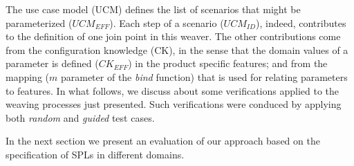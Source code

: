 The use case model (UCM) defines the list of scenarios that might be parameterized ($UCM_{EFF}$). Each step of a scenario ($UCM_{ID}$), indeed, contributes to the definition of one join point in this weaver. The
other contributions come from the configuration knowledge (CK), in the sense that the domain values
of a parameter is defined ($CK_{EFF}$) in the product specific features; and from the mapping ($m$ parameter of the \emph{bind} function) that is used for relating parameters to features.
In what follows, we discuss about some verifications applied to the weaving processes just presented. Such verifications were conduced by applying both \emph{random} and \emph{guided} test cases.

In the next section we present an evaluation of our approach based on the
specification of SPLs in different domains.

